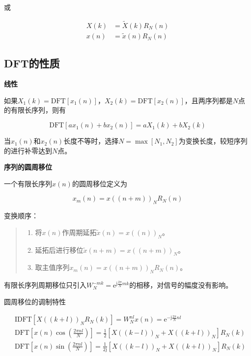\documentclass[cn, hazy, blue, normal, 12pt]{elegantnote}
\begin{document}
或

\begin{equation}
\begin{aligned}
    X(k)&=\widetilde{X}(k)R_N(n) \\
    x(n)&=\widetilde{x}(n)R_N(n)
\end{aligned}
\end{equation}

\subsection{DFT的性质}

\textbf{线性}

如果${X}_1(k)=\text{DFT}[{x}_1(n)]$，${X}_2(k)=\text{DFT}[{x}_2(n)]$，且两序列都是$N$点的有限长序列，则有

\begin{equation}
    \text{DFT}[a{x}_1(n)+b{x}_2(n)]=a{X}_1(k)+b{X}_2(k)
\end{equation}

当${x}_1(n)$和${x}_2(n)$长度不等时，选择$N=\max{[N_1, N_2]}$为变换长度，较短序列的进行补零达到$N$点。

\textbf{序列的圆周移位}

一个有限长序列$x(n)$的圆周移位定义为

\begin{equation}
    x_m(n)=x((n+m))_N R_N(n)
\end{equation}

变换顺序：

\begin{quote}
\begin{enumerate}
    \item 将$x(n)$作周期延拓$\widetilde{x}(n)=x((n))_N$。
    \item 延拓后进行移位$\widetilde{x}(n+m)=x((n+m))_N$。
    \item 取主值序列$x_m(n)=x((n+m))_N R_N(n)$。
\end{enumerate}
\end{quote}

有限长序列周期移位只引入$W_{N}^{-mk}=\text{e}^{\text{j}\frac{2\pi}{N}mk}$的相移，对信号的幅度没有影响。

圆周移位的调制特性

\begin{equation}
\begin{aligned}
    &\text{IDFT}[X((k+l))_N R_N(k)]=W_N^{nl}x(n)=\text{e}^{-\text{j}\frac{2\pi}{N}nl} \\
    &\text{DFT}[x(n)\cos(\frac{2\pi nl}{N})]=\frac{1}{2}[X((k-l))_N+X((k+l))_N]R_N(k) \\
    &\text{DFT}[x(n)\sin(\frac{2\pi nl}{N})]=\frac{1}{2\text{j}}[X((k-l))_N+X((k+l))_N]R_N(k)
\end{aligned}
\end{equation}
\end{document}
